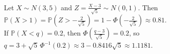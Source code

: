 \begin{example} \label{ex:normal-tail-and-quantile-standardization} \\
Let $X\sim N(3,5)$ and $Z=\frac{X-3}{\sqrt5}\sim N(0,1)$. Then $\mathbb{P}(X>1)=\mathbb{P}(Z>-\frac{2}{\sqrt5})=1-\Phi(-\frac{2}{\sqrt5})\approx0.81$.\\
If $\mathbb{P}(X<q)=0.2$, then $\Phi(\frac{q-3}{\sqrt5})=0.2$, so $q=3+\sqrt5\,\Phi^{-1}(0.2)\approx3-0.8416\sqrt5\approx1.1181$.
\end{example}
